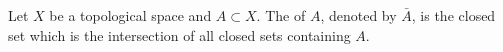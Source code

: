 Let $X$ be a topological space and $A \subset X$. The  of $A$, denoted by $\bar{A}$, is the closed set which is the intersection of all closed sets containing $A$.

